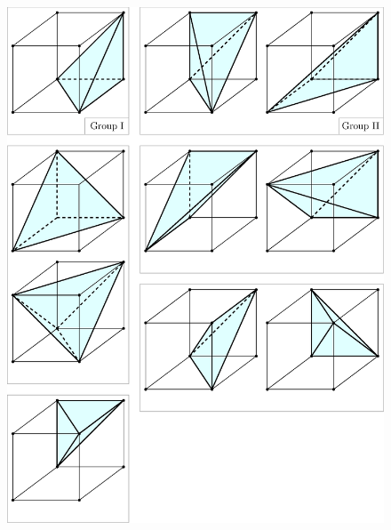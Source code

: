 \documentclass[eikonal.tex]{subfiles}
\begin{document}
\begin{figure}
  \centering
  \includegraphics[width=\linewidth]{tetra-by-group.eps}
\end{figure}
\end{document}
